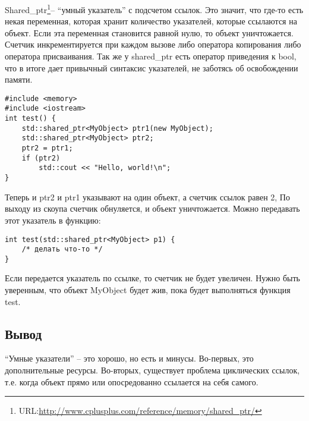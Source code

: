 
Shared_ptr\footnote{URL:\url{http://www.cplusplus.com/reference/memory/shared_ptr/}}-- ``умный указатель'' с подсчетом ссылок. Это значит, что где-то есть некая переменная, которая хранит количество указателей, которые ссылаются на объект. Если эта переменная становится равной нулю, то объект уничтожается. Счетчик инкрементируется при каждом вызове либо оператора копирования либо оператора присваивания. Так же у shared_ptr есть оператор приведения к bool, что в итоге дает привычный синтаксис указателей, не заботясь об освобождении памяти.
\begin{lstlisting}
#include <memory> 
#include <iostream>
int test() {
    std::shared_ptr<MyObject> ptr1(new MyObject);
    std::shared_ptr<MyObject> ptr2;    
    ptr2 = ptr1;    
    if (ptr2)
        std::cout << "Hello, world!\n";
}
\end{lstlisting}

Теперь и ptr2 и ptr1 указывают на один объект, а счетчик ссылок равен 2, По выходу из скоупа счетчик обнуляется, и объект уничтожается. Можно передавать этот указатель в функцию:
\begin{lstlisting}
int test(std::shared_ptr<MyObject> p1) {
    /* делать что-то */
}
\end{lstlisting}

Если передается указатель по ссылке, то счетчик не будет увеличен. Нужно быть уверенным, что объект MyObject будет жив, пока будет выполняться функция test.
\subsection{Вывод}
``Умные указатели'' -- это хорошо, но есть и минусы. 
Во-первых, это дополнительные ресурсы.
Во-вторых, существует проблема циклических ссылок, т.е. когда объект прямо или опосредованно ссылается на себя самого.
